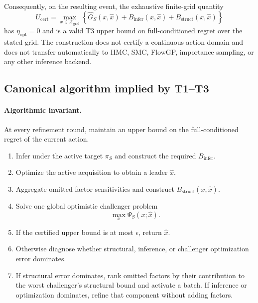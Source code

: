 Consequently, on the resulting event, the exhaustive finite-grid quantity
\begin{equation}
 U_{\mathrm{cert}}
 =\max_{x\in\mathcal X_{\mathrm{grid}}}
 \left\{
 \widehat G_S(x,\widehat x)
 +B_{\mathrm{infer}}(x,\widehat x)
 +B_{\mathrm{struct}}(x,\widehat x)
 \right\}
 \label{eq:finite-grid-u-cert}
\end{equation}
has $\eta_{\mathrm{opt}}=0$ and is a valid T3 upper bound on full-conditioned
regret over the stated grid.  The construction does not certify a continuous
action domain and does not transfer automatically to HMC, SMC, FlowGP,
importance sampling, or any other inference backend.

\subsection{Canonical algorithm implied by T1--T3}

\paragraph{Algorithmic invariant.}
At every refinement round, maintain an upper bound on the full-conditioned
regret of the current action.

\begin{enumerate}
    \item Infer under the active target $\pi_S$ and construct the required
          $B_{\mathrm{infer}}$.
    \item Optimize the active acquisition to obtain a leader $\widehat x$.
    \item Aggregate omitted factor sensitivities and construct
          $B_{\mathrm{struct}}(x,\widehat x)$.
    \item Solve one global optimistic challenger problem
          \[
          \max_x \Psi_S(x;\widehat x).
          \]
    \item If the certified upper bound is at most $\epsilon$, return
          $\widehat x$.
    \item Otherwise diagnose whether structural, inference, or challenger
          optimization error dominates.
    \item If structural error dominates, rank omitted factors by their
          contribution to the worst challenger's structural bound and activate
          a batch.  If inference or optimization dominates, refine that component
          without adding factors.
\end{enumerate}


